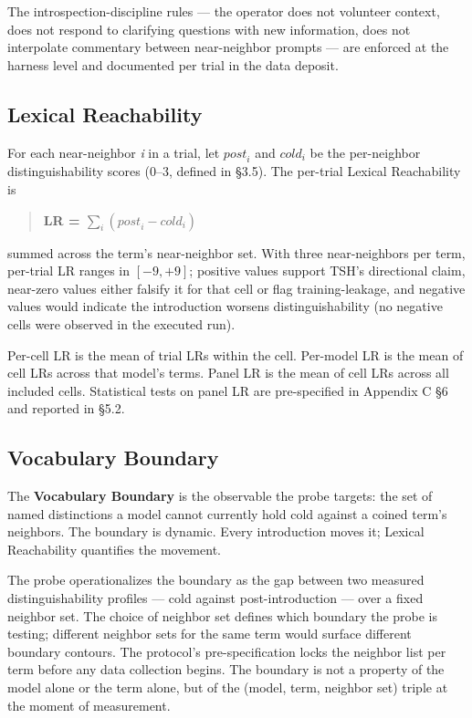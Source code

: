 \documentclass[11pt,a4paper]{article}
\begin{document}
The introspection-discipline rules --- the operator does not volunteer context, does not respond to clarifying questions with new information, does not interpolate commentary between near-neighbor prompts --- are enforced at the harness level and documented per trial in the data deposit.

\subsection{Lexical Reachability}

For each near-neighbor \textit{i} in a trial, let $\textit{post}_i$ and $\textit{cold}_i$ be the per-neighbor distinguishability scores (0--3, defined in \S3.5). The per-trial Lexical Reachability is

\begin{quote}
\textbf{LR = $\sum_i (\textit{post}_i - \textit{cold}_i)$}
\end{quote}

summed across the term's near-neighbor set. With three near-neighbors per term, per-trial LR ranges in $[-9, +9]$; positive values support TSH's directional claim, near-zero values either falsify it for that cell or flag training-leakage, and negative values would indicate the introduction worsens distinguishability (no negative cells were observed in the executed run).

Per-cell LR is the mean of trial LRs within the cell. Per-model LR is the mean of cell LRs across that model's terms. Panel LR is the mean of cell LRs across all included cells. Statistical tests on panel LR are pre-specified in Appendix C \S6 and reported in \S5.2.

\subsection{Vocabulary Boundary}

The \textbf{Vocabulary Boundary} is the observable the probe targets: the set of named distinctions a model cannot currently hold cold against a coined term's neighbors. The boundary is dynamic. Every introduction moves it; Lexical Reachability quantifies the movement.

The probe operationalizes the boundary as the gap between two measured distinguishability profiles --- cold against post-introduction --- over a fixed neighbor set. The choice of neighbor set defines which boundary the probe is testing; different neighbor sets for the same term would surface different boundary contours. The protocol's pre-specification locks the neighbor list per term before any data collection begins. The boundary is not a property of the model alone or the term alone, but of the (model, term, neighbor set) triple at the moment of measurement.
\end{document}
